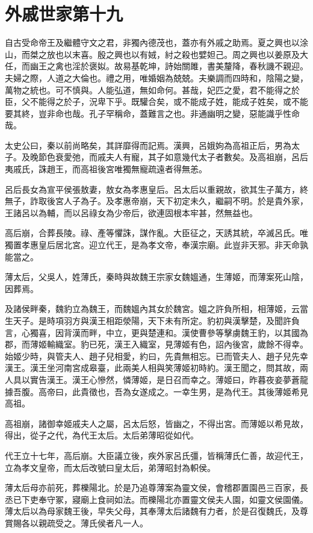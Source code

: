 \chapter{外戚世家第十九}

自古受命帝王及繼體守文之君，非獨內德茂也，蓋亦有外戚之助焉。夏之興也以涂山，而桀之放也以末喜。殷之興也以有娀，紂之殺也嬖妲己。周之興也以姜原及大任，而幽王之禽也淫於褒姒。故易基乾坤，詩始關雎，書美釐降，春秋譏不親迎。夫婦之際，人道之大倫也。禮之用，唯婚姻為兢兢。夫樂調而四時和，陰陽之變，萬物之統也。可不慎與。人能弘道，無如命何。甚哉，妃匹之愛，君不能得之於臣，父不能得之於子，況卑下乎。既驩合矣，或不能成子姓，能成子姓矣，或不能要其終，豈非命也哉。孔子罕稱命，蓋難言之也。非通幽明之變，惡能識乎性命哉。

太史公曰，秦以前尚略矣，其詳靡得而記焉。漢興，呂娥姁為高祖正后，男為太子。及晚節色衰愛弛，而戚夫人有寵，其子如意幾代太子者數矣。及高祖崩，呂后夷戚氏，誅趙王，而高祖後宮唯獨無寵疏遠者得無恙。

呂后長女為宣平侯張敖妻，敖女為孝惠皇后。呂太后以重親故，欲其生子萬方，終無子，詐取後宮人子為子。及孝惠帝崩，天下初定未久，繼嗣不明。於是貴外家，王諸呂以為輔，而以呂祿女為少帝后，欲連固根本牢甚，然無益也。

高后崩，合葬長陵。祿、產等懼誅，謀作亂。大臣征之，天誘其統，卒滅呂氏。唯獨置孝惠皇后居北宮。迎立代王，是為孝文帝，奉漢宗廟。此豈非天邪。非天命孰能當之。

薄太后，父吳人，姓薄氏，秦時與故魏王宗家女魏媼通，生薄姬，而薄案死山陰，因葬焉。

及諸侯畔秦，魏豹立為魏王，而魏媼內其女於魏宮。媼之許負所相，相薄姬，云當生天子。是時項羽方與漢王相距滎陽，天下未有所定。豹初與漢擊楚，及聞許負言，心獨喜，因背漢而畔，中立，更與楚連和。漢使曹參等擊虜魏王豹，以其國為郡，而薄姬輸織室。豹已死，漢王入織室，見薄姬有色，詔內後宮，歲餘不得幸。始姬少時，與管夫人、趙子兒相愛，約曰，先貴無相忘。已而管夫人、趙子兒先幸漢王。漢王坐河南宮成皋臺，此兩美人相與笑薄姬初時約。漢王聞之，問其故，兩人具以實告漢王。漢王心慘然，憐薄姬，是日召而幸之。薄姬曰，昨暮夜妾夢蒼龍據吾腹。高帝曰，此貴徵也，吾為女遂成之。一幸生男，是為代王。其後薄姬希見高祖。

高祖崩，諸御幸姬戚夫人之屬，呂太后怒，皆幽之，不得出宮。而薄姬以希見故，得出，從子之代，為代王太后。太后弟薄昭從如代。

代王立十七年，高后崩。大臣議立後，疾外家呂氏彊，皆稱薄氏仁善，故迎代王，立為孝文皇帝，而太后改號曰皇太后，弟薄昭封為軹侯。

薄太后母亦前死，葬櫟陽北。於是乃追尊薄案為靈文侯，會稽郡置園邑三百家，長丞已下吏奉守冢，寢廟上食祠如法。而櫟陽北亦置靈文侯夫人園，如靈文侯園儀。薄太后以為母家魏王後，早失父母，其奉薄太后諸魏有力者，於是召復魏氏，及尊賞賜各以親疏受之。薄氏侯者凡一人。

